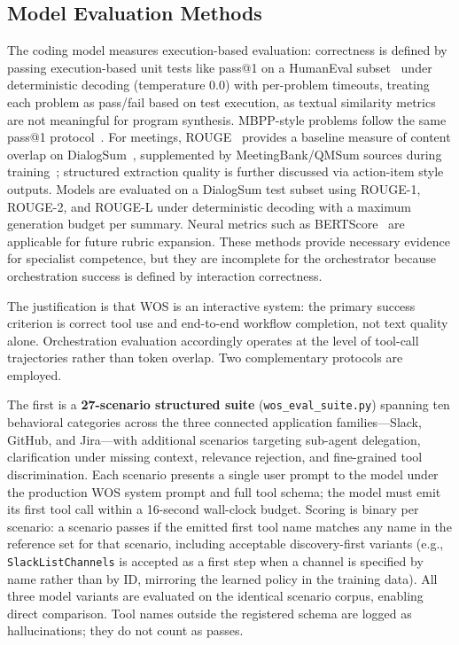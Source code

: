 \documentclass[conference]{IEEEtran}
\begin{document}
\subsection{Model Evaluation Methods}\label{subsec:eval_methods}
The coding model measures execution-based evaluation: correctness is defined by passing execution-based unit tests like pass@1 on a HumanEval subset~\cite{chen2021evaluating} under deterministic decoding (temperature 0.0) with per-problem timeouts, treating each problem as pass/fail based on test execution, as textual similarity metrics are not meaningful for program synthesis. MBPP-style problems follow the same pass@1 protocol~\cite{austin2021program}. For meetings, ROUGE~\cite{lin2004rouge} provides a baseline measure of content overlap on DialogSum~\cite{chen2021dialogsum}, supplemented by MeetingBank/QMSum sources during training~\cite{meetingbank2023,zhong2021qmsum}; structured extraction quality is further discussed via action-item style outputs. Models are evaluated on a DialogSum test subset using ROUGE-1, ROUGE-2, and ROUGE-L under deterministic decoding with a maximum generation budget per summary. Neural metrics such as BERTScore~\cite{zhang2019bertscore} are applicable for future rubric expansion. These methods provide necessary evidence for specialist competence, but they are incomplete for the orchestrator because orchestration success is defined by interaction correctness.

The justification is that WOS is an interactive system: the primary success criterion is correct tool use and end-to-end workflow completion, not text quality alone. Orchestration evaluation accordingly operates at the level of tool-call trajectories rather than token overlap. Two complementary protocols are employed.

The first is a \textbf{27-scenario structured suite} (\texttt{wos\_eval\_suite.py}) spanning ten behavioral categories across the three connected application families---Slack, GitHub, and Jira---with additional scenarios targeting sub-agent delegation, clarification under missing context, relevance rejection, and fine-grained tool discrimination. Each scenario presents a single user prompt to the model under the production WOS system prompt and full tool schema; the model must emit its first tool call within a 16-second wall-clock budget. Scoring is binary per scenario: a scenario passes if the emitted first tool name matches any name in the reference set for that scenario, including acceptable discovery-first variants (e.g., \texttt{SlackListChannels} is accepted as a first step when a channel is specified by name rather than by ID, mirroring the learned policy in the training data). All three model variants are evaluated on the identical scenario corpus, enabling direct comparison. Tool names outside the registered schema are logged as hallucinations; they do not count as passes.
\end{document}
